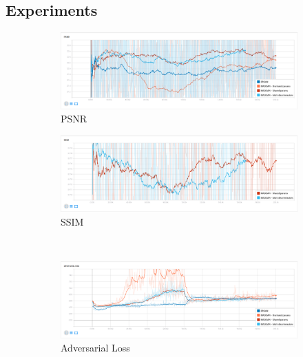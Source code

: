 \documentclass[12pt,a4paper]{article}
\begin{document}
\begin{multicols}{2}
        \section{Experiments}
            \begin{figure}
                \centering
                \begin{subfigure}{0.48\textwidth}
                    \includegraphics[width=\textwidth]{images/psnr.png}
                    \caption{PSNR}
                \end{subfigure}
                \quad
                \begin{subfigure}{0.48\textwidth}
                    \includegraphics[width=\textwidth]{images/ssim.png}
                    \caption{SSIM}
                \end{subfigure}\\[5mm]
                \begin{subfigure}{0.48\textwidth}
                    \includegraphics[width=\textwidth]{images/adv-loss.png}
                    \caption{Adversarial Loss}
                \end{subfigure}
                \quad
                \begin{subfigure}{0.48\textwidth}

\end{subfigure}
\end{figure}
\end{multicols}
\end{document}

